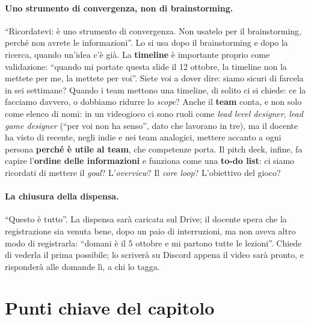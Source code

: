 \paragraph{Uno strumento di convergenza, non di brainstorming.} ``Ricordatevi: è uno
strumento di convergenza. Non usatelo per il brainstorming, perché non avrete le
informazioni''. Lo si usa dopo il brainstorming e dopo la ricerca, quando un'idea c'è già.
La \textbf{timeline} è importante proprio come validazione: ``quando mi portate questa slide
il 12 ottobre, la timeline non la mettete per me, la mettete per voi''. Siete voi a dover
dire: siamo sicuri di farcela in sei settimane? Quando i team mettono una timeline, di
solito ci si chiede: ce la facciamo davvero, o dobbiamo ridurre lo \emph{scope}? Anche il
\textbf{team} conta, e non solo come elenco di nomi: in un videogioco ci sono ruoli come
\emph{lead level designer}, \emph{lead game designer} (``per voi non ha senso'', dato che
lavorano in tre), ma il docente ha visto di recente, negli indie e nei team analogici,
mettere accanto a ogni persona \textbf{perché è utile al team}, che competenze porta. Il
pitch deck, infine, fa capire l'\textbf{ordine delle informazioni} e funziona come una
\textbf{to-do list}: ci siamo ricordati di mettere il \emph{goal}? L'\emph{overview}? Il
\emph{core loop}? L'obiettivo del gioco?

\paragraph{La chiusura della dispensa.} ``Questo è tutto''. La dispensa sarà caricata sul
Drive; il docente spera che la registrazione sia venuta bene, dopo un paio di
interruzioni, ma non aveva altro modo di registrarla: ``domani è il 5 ottobre e mi partono
tutte le lezioni''. Chiede di vederla il prima possibile; lo scriverà su Discord appena il
video sarà pronto, e risponderà alle domande lì, a chi lo tagga.

\section*{Punti chiave del capitolo}

